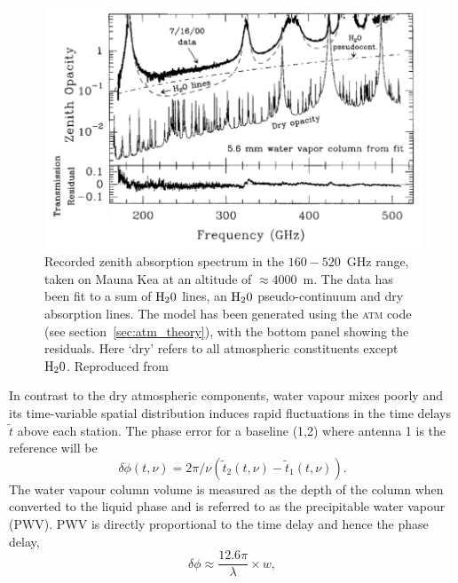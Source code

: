 \begin{figure}
\begin{center}
\includegraphics[width=\columnwidth]{Images/absorption}
\caption{Recorded zenith absorption spectrum in the $160-520$~GHz range, taken on Mauna Kea at an altitude of $\approx 4000$~m. The data has been fit to a sum of $\rm H_20$ lines, an $\rm H_20$ pseudo-continuum and dry absorption lines. The model has been generated using the \textsc{atm} code (see section~\ref{sec:atm_theory}), with the bottom panel showing the residuals. Here `dry' refers to all atmospheric constituents except $\rm H_20$. Reproduced from \citet{Pardo_2001} \label{fig:absorption}
}
\end{center}
\end{figure}

In contrast to the dry atmospheric components, water vapour mixes poorly and its time-variable spatial distribution induces rapid fluctuations in the time delays $\tilde{t}$ above each station. The phase error for a baseline (1,2) where antenna 1 is the reference will be
\begin{equation}\label{eq:phase_ref}
\delta \phi(t, \nu) = 2\pi/\nu(\tilde{t}_2(t, \nu) - \tilde{t}_1(t, \nu)).
\end{equation}
The water vapour column volume is measured as the depth of the column when converted to the liquid phase and is referred to as the precipitable water vapour (PWV). PWV is directly proportional to the time delay and hence the phase delay, 
\begin{equation}
\delta\phi \approx \frac{12.6\pi}{\lambda} \times w, 
\end{equation}\label{eq:phi-pwv}

